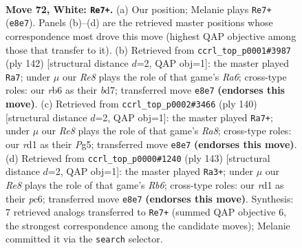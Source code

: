 \documentclass[11pt]{article}
\begin{document}
\clearpage

\begin{figure}[p]\centering
\begin{subfigure}{0.46\textwidth}\centering
\resizebox{\linewidth}{!}{%
\newchessgame
\chessboard[
  setfen={4R3/7k/1r6/8/5K2/8/7P/3r4 w - - 11 72},
  showmover=false,
  pgfstyle=straightmove, color=movearrow, markmove={e8-e7}
]}
\caption{}
\end{subfigure}\hfill
\begin{subfigure}{0.46\textwidth}\centering
\resizebox{\linewidth}{!}{%
\newchessgame
\chessboard[
  setfen={8/3b4/R7/4k2P/8/8/5K2/2r5 w - - 2 72},
  showmover=false,
  pgfstyle=straightmove, color=movearrow, markmove={a6-a7}
]}
\caption{}
\end{subfigure}
\\[4pt]
\begin{subfigure}{0.46\textwidth}\centering
\resizebox{\linewidth}{!}{%
\newchessgame
\chessboard[
  setfen={R7/4k3/8/6Pp/8/1r6/8/4K3 w - - 9 71},
  showmover=false,
  pgfstyle=straightmove, color=movearrow, markmove={a8-a7}
]}
\caption{}
\end{subfigure}\hfill
\begin{subfigure}{0.46\textwidth}\centering
\resizebox{\linewidth}{!}{%
\newchessgame
\chessboard[
  setfen={8/K7/2P2k2/8/5p2/1r6/7R/8 b - - 1 72},
  showmover=false,
  pgfstyle=straightmove, color=movearrow, markmove={b3-a3}
]}
\caption{}
\end{subfigure}
\caption{\textbf{Move 72, White: \texttt{Re7+}.} (a) Our position; Melanie plays \texttt{Re7+} (\texttt{e8e7}). Panels (b)--(d) are the retrieved master positions whose correspondence most drove this move (highest QAP objective among those that transfer to it). (b) Retrieved from \texttt{ccrl\_top\_p0001\#3987} (ply 142) [structural distance $d$=2, QAP obj=1]: the master played \texttt{Ra7}; under $\mu$ our \emph{Re8} plays the role of that game's \emph{Ra6}; cross-type roles: our \emph{r}b6 as their \emph{b}d7; transferred move \texttt{e8e7} \textbf{(endorses this move)}. (c) Retrieved from \texttt{ccrl\_top\_p0002\#3466} (ply 140) [structural distance $d$=2, QAP obj=1]: the master played \texttt{Ra7+}; under $\mu$ our \emph{Re8} plays the role of that game's \emph{Ra8}; cross-type roles: our \emph{r}d1 as their \emph{P}g5; transferred move \texttt{e8e7} \textbf{(endorses this move)}. (d) Retrieved from \texttt{ccrl\_top\_p0000\#1240} (ply 143) [structural distance $d$=2, QAP obj=1]: the master played \texttt{Ra3+}; under $\mu$ our \emph{Re8} plays the role of that game's \emph{Rb6}; cross-type roles: our \emph{r}d1 as their \emph{p}c6; transferred move \texttt{e8e7} \textbf{(endorses this move)}. Synthesis: 7 retrieved analogs transferred to \texttt{Re7+} (summed QAP objective 6, the strongest correspondence among the candidate moves); Melanie committed it via the \texttt{search} selector.}
\label{fig:thought-m142}
\end{figure}
\end{document}
